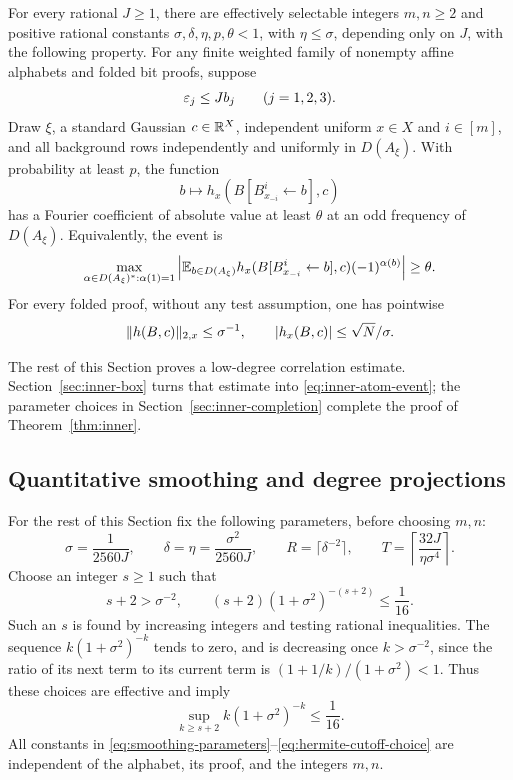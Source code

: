 \begin{theorem}\label{thm:inner}
For every rational $J\ge1$, there are effectively selectable integers
$m,n\ge2$ and positive rational constants $\sigma,\delta,\eta,p,\theta<1$,
with $\eta\le\sigma$, depending only on $J$, with the following property.
For any finite weighted family of nonempty affine alphabets and folded
bit proofs, suppose
\[
 \varepsilon_j\le Jb_j\qquad(j=1,2,3).
\]
Draw $\xi$, a standard Gaussian $c\in\mathbb R^X$, independent uniform
$x\in X$ and $i\in[m]$, and all background rows independently and
uniformly in $D(A_\xi)$. With probability at least $p$, the function
\[
 b\longmapsto h_x(B[B^i_{x_{-i}}\leftarrow b],c)
\]
has a Fourier coefficient of absolute value at least $\theta$ at an odd
frequency of $D(A_\xi)$. Equivalently, the event is
\begin{equation}\label{eq:inner-atom-event}
 \max_{\alpha\in D(A_\xi)^*: \alpha(1)=1}
 \left|\mathbb E_{b\in D(A_\xi)}
 h_x(B[B^i_{x_{-i}}\leftarrow b],c)(-1)^{\alpha(b)}\right|
 \ge\theta.
\end{equation}
For every folded proof, without any test assumption, one has pointwise
\begin{equation}\label{eq:gradient-bounds}
 \lVert h(B,c)\rVert_{2,x}\le\sigma^{-1},\qquad
 |h_x(B,c)|\le\sqrt N/\sigma.
\end{equation}
\end{theorem}

The rest of this Section proves a low-degree correlation estimate.
Section~\ref{sec:inner-box} turns that estimate into
\eqref{eq:inner-atom-event}; the parameter choices in
Section~\ref{sec:inner-completion} complete the proof of
Theorem~\ref{thm:inner}.

\subsection{Quantitative smoothing and degree projections}

For the rest of this Section fix the following parameters, before choosing
$m,n$:
\begin{equation}\label{eq:smoothing-parameters}
 \sigma=\frac1{2560J},\qquad
 \delta=\eta=\frac{\sigma^2}{2560J},\qquad
 R=\lceil\delta^{-2}\rceil,\qquad
 T=\left\lceil\frac{32J}{\eta\sigma^4}\right\rceil.
\end{equation}
Choose an integer $s\ge1$ such that
\begin{equation}\label{eq:hermite-cutoff-choice}
 s+2>\sigma^{-2},\qquad
 (s+2)(1+\sigma^2)^{-(s+2)}\le\frac1{16}.
\end{equation}
Such an $s$ is found by increasing integers and testing rational
inequalities. The sequence $k(1+\sigma^2)^{-k}$ tends to zero, and is
decreasing once $k>\sigma^{-2}$, since the ratio of its next term to its
current term is $(1+1/k)/(1+\sigma^2)<1$. Thus these choices are effective
and imply
\begin{equation}\label{eq:hermite-tail-choice}
 \sup_{k\ge s+2} k(1+\sigma^2)^{-k}\le\frac1{16}.
\end{equation}
All constants in \eqref{eq:smoothing-parameters}--\eqref{eq:hermite-cutoff-choice}
are independent of the alphabet, its proof, and the integers $m,n$.

